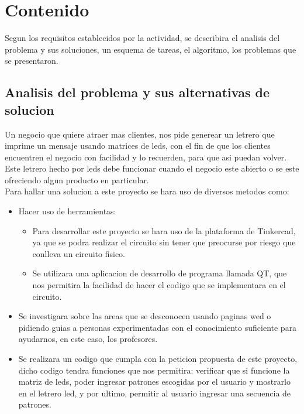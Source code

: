 \documentclass{article}
\begin{document}
\newpage

\section{Contenido} \label{contenido}
Segun los requisitos establecidos por la actividad, se describira el analisis del problema y sus soluciones, un esquema de tareas, el algoritmo, los problemas que se presentaron. 

\subsection{Analisis del problema y sus alternativas de solucion}
Un negocio que quiere atraer mas clientes, nos pide generear un letrero que imprime un mensaje usando matrices de leds, con el fin de que los clientes encuentren el negocio con facilidad y lo recuerden, para que asi puedan volver. Este letrero hecho por leds debe funcionar cuando el negocio este abierto o se este ofreciendo algun producto en particular.\\

Para hallar una solucion a este proyecto se hara uso de diversos metodos como:
\begin{itemize}
    \item Hacer uso de herramientas:
    \begin{itemize}
        \item Para desarrollar este proyecto se hara uso de la plataforma de Tinkercad, ya que se podra realizar el circuito sin tener que preocurse por riesgo que conlleva un circuito fisico.
    \item Se utilizara una aplicacion de desarrollo de programa llamada QT, que nos permitira la facilidad de hacer el codigo que se implementara en el circuito.
    \end{itemize}
    \item Se investigara sobre las areas que se desconocen usando paginas wed o pidiendo guias a personas experimentadas con el conocimiento suficiente para ayudarnos, en este caso, los profesores.
    \item Se realizara un codigo que cumpla con la peticion propuesta de este proyecto, dicho codigo tendra funciones que nos permitira: verificar que si funcione la matriz de leds, poder ingresar patrones escogidas por el usuario y mostrarlo en el letrero led, y por ultimo, permitir al usuario ingresar una secuencia de patrones. 
\end{itemize}
\end{document}
